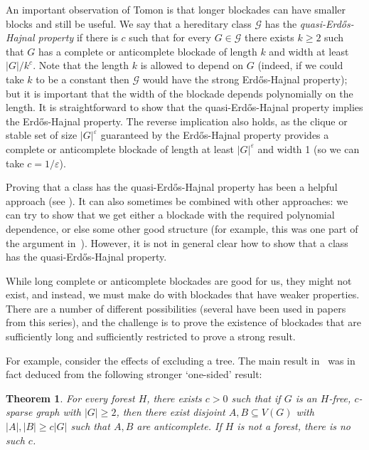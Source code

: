 \documentclass[11pt,reqno,a4paper]{amsart}
\newtheorem{theorem}{Theorem}[section]
\newcommand{\eps}{\varepsilon}
\begin{document}
	An important observation of Tomon \cite{tomon} is that longer blockades  can have smaller blocks and still be useful.  We say that a hereditary class $\mathcal G$ has the {\em quasi-Erd\H os-Hajnal property} if there is $c$ such that for every 
	$G\in \mathcal G$ there exists $k\ge 2$ such that $G$ has a complete or anticomplete blockade of length $k$ and width at least $|G|/k^c$.  
	Note that the length $k$ is allowed to depend on $G$ (indeed, if we could take $k$ to be a constant then $\mathcal G$ would have 
	the strong Erd\H os-Hajnal property); but it is important that the width of the blockade depends polynomially on the length. It is 
	straightforward to show that the quasi-Erd\H os-Hajnal property implies the Erd\H os-Hajnal property.  The reverse implication also holds, as the clique or stable set of size $|G|^\eps$ guaranteed by the Erd\H os-Hajnal property provides a complete or anticomplete blockade of length at least $|G|^\eps$ and width 1 (so we can take $c=1/\eps$).
	
	
	Proving that a class has the quasi-Erd\H os-Hajnal property has been a helpful approach (see \cite{pt,MR4563865}). It can also 
	sometimes be combined with other approaches: we can try to show that we get either a blockade with the required polynomial dependence, or 
	else some other good structure (for example, this was one part of the argument in~\cite{density6}).  However, it is not in general clear how to show that a class has the quasi-Erd\H os-Hajnal property.
	
	While long complete or anticomplete blockades are good for us, they might not exist, and instead, we must make do with blockades 
	that have weaker properties.  There are a number of different possibilities (several have been used in papers from this series), and the challenge is to prove the existence of blockades that are sufficiently long and sufficiently restricted to prove a strong result.
	
	For example, consider the effects of excluding a tree.  The main result in~\cite{MR4170220} was in fact deduced from the following stronger `one-sided' result:
	\begin{theorem} \label{pure1}
		For every forest $H$, there exists $c>0$ such that if $G$ is an $H$-free, $c$-sparse graph  with $|G|\ge 2$, then there exist disjoint $A,B\subseteq V(G)$ with $|A|,|B|\ge c|G|$ such that $A,B$ are anticomplete. If $H$ is not a forest, there is no such $c$.
	\end{theorem}
	
\end{document}
